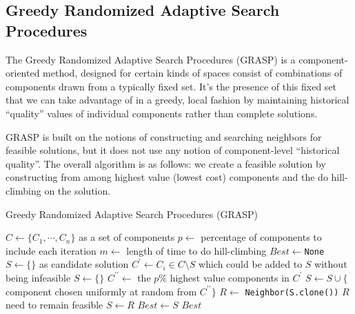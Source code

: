             \subsection{Greedy Randomized Adaptive Search Procedures}
                The Greedy Randomized Adaptive Search Procedures (GRASP) is a component-oriented method, designed for certain kinds of spaces consist of combinations of components drawn from a typically fixed set. It's the presence of this fixed set that we can take advantage of in a greedy, local fashion by maintaining historical ``quality'' values of individual components rather than complete solutions.

                GRASP is built on the notions of constructing and searching neighbors for feasible solutions, but it does not use any notion of component-level ``historical quality''. The overall algorithm is as follows: we create a feasible solution by constructing from among highest value (lowest cost) components and the do hill-climbing on the solution.

                \begin{algorithm}[!htp]
                    \centering
                    \caption{Greedy Randomized Adaptive Search Procedures (GRASP)}
                    \begin{algorithmic}[1]
                        \State $C \gets \{C_1, \cdots, C_n\}$ as a set of components
                        \State $p \gets$ percentage of components to include each iteration
                        \State $m \gets$ length of time to do hill-climbing
                        \State $Best \gets $\texttt{None}
                            \State $S \gets \{\}$ as candidate solution
                                \State $C^\prime \gets C_i \in C \setminus S$ which could be added to $S$ without being infeasible
                                    \State $S \gets \{\}$
                                \Else
                                    \State $C^{\prime\prime} \gets$ the $p\%$ highest value components in $C^\prime$
                                    \State $S \gets S \cup \{$component chosen uniformly at random from $C^{\prime\prime}\}$
                                \EndIf
                            \EndWhile
                                \State $R \gets$ \texttt{Neighbor(S.clone())}
                                \Comment $R$ need to remain feasible
                                    \State $S \gets R$
                                \EndIf
                            \EndFor
                                \State $Best \gets S$
                            \EndIf
                        \EndWhile
                        \State \Return $Best$
                    \end{algorithmic}
                \end{algorithm}

